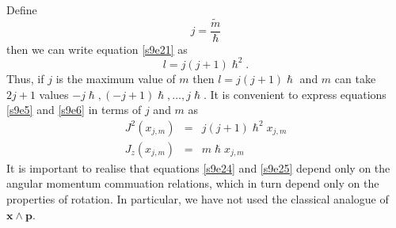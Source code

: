 \documentclass{article}
\numberwithin{equation}{section}
\let\vec\bm
\theoremstyle{plain}
\numberwithin{thm}{section}
\theoremstyle{plain}
\numberwithin{prop}{section}
\theoremstyle{definition}
\numberwithin{defn}{section}
\theoremstyle{remark}
\begin{document}
Define
\begin{equation}\label{s9e22}
j = \frac{\tilde{m}}{\hslash}
\end{equation}
then we can write equation \eqref{s9e21} as
\begin{equation}\label{s9e23}
l = j(j + 1)\hslash^2.
\end{equation}
Thus, if $j$ is the maximum value of $m$ then $l = j(j+1)\hslash$ and $m$ can
take $2j+1$ values $-j\hslash, (-j + 1)\hslash, \ldots, j\hslash$. It is 
convenient to express equations \eqref{s9e5} and \eqref{s9e6} in terms of $j$
and $m$ as 
\begin{eqnarray}
J^2(x_{j,m}) &=& j(j + 1)\hslash^2 x_{j, m} \label{s9e24} \\
J_z(x_{j,m}) &=& m\hslash x_{j, m} \label{s9e25}
\end{eqnarray}
It is important to realise that equations \eqref{s9e24} and \eqref{s9e25}
depend only on the angular momentum commuation relations, which in turn depend
only on the properties of rotation. In particular, we have not used the 
classical analogue of $\vec{x} \wedge \vec{p}$.



\end{document}
